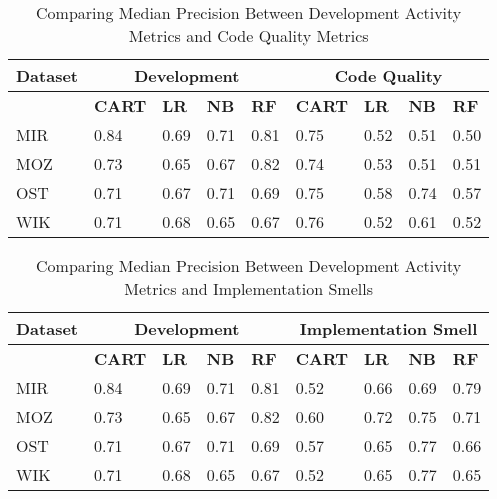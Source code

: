 \documentclass[smallextended]{svjour3}       %
\begin{document}
\begin{table*}[]
\centering
\caption{Comparing Median Precision Between Development Activity Metrics and Code Quality Metrics} 
\label{res:rq1:table:pre:code}
\footnotesize{  
\begin{tabular}{p{1.2cm} p{0.9cm} p{0.9cm} p{0.9cm} p{0.9cm} p{0.9cm} p{0.6cm} p{0.6cm} p{0.6cm}  }
\hline
\textbf{Dataset} & \multicolumn{4}{c}{\textbf{Development}} & \multicolumn{4}{c}{\textbf{Code Quality}}  \\
\hline
 &  \textbf{CART} & \textbf{LR} & \textbf{NB} & \textbf{RF} & \textbf{CART} & \textbf{LR} & \textbf{NB} & \textbf{RF}  \\
\hline
MIR & \cellcolor{lightgray} 0.84 & 0.69 & 0.71 &                        0.81 & 0.75                       & 0.52 & 0.51 & 0.50  \\
MOZ & 0.73                       & 0.65 & 0.67 & \cellcolor{lightgray}  0.82 & 0.74                       & 0.53 & 0.51 & 0.51   \\
OST & 0.71                       & 0.67 & 0.71 & 0.69                        & \cellcolor{lightgray} 0.75 & 0.58 & 0.74 & 0.57   \\
WIK & 0.71                       & 0.68 & 0.65 & 0.67                        & \cellcolor{lightgray} 0.76 & 0.52 & 0.61 & 0.52    \\
\hline
\end{tabular}
}
\end{table*} 

\begin{table*}[]
\centering
\caption{Comparing Median Precision Between Development Activity Metrics and Implementation Smells}
\label{res:rq1:table:pre:smell}
\footnotesize{  
\begin{tabular}{p{1.2cm} p{0.9cm} p{0.9cm} p{0.9cm} p{0.9cm} p{0.9cm} p{0.6cm} p{0.6cm} p{0.6cm}  }
\hline
\textbf{Dataset} & \multicolumn{4}{c}{\textbf{Development}} & \multicolumn{4}{c}{\textbf{Implementation Smell}}  \\
\hline
 &  \textbf{CART} & \textbf{LR} & \textbf{NB} & \textbf{RF} & \textbf{CART} & \textbf{LR} & \textbf{NB} & \textbf{RF}  \\
\hline
MIR & \cellcolor{lightgray} 0.84 & 0.69 & 0.71 &                        0.81 & 0.52 & 0.66 & 0.69 & 0.79   \\
MOZ & 0.73                       & 0.65 & 0.67 & \cellcolor{lightgray}  0.82 & 0.60 & 0.72 & 0.75 & 0.71   \\
OST & 0.71                       & 0.67 & 0.71 & 0.69                        & 0.57 & 0.65 & \cellcolor{lightgray} 0.77 & 0.66   \\
WIK & 0.71                       & 0.68 & 0.65 & 0.67                        & 0.52 & 0.65 & \cellcolor{lightgray} 0.77 & 0.65   \\
\hline
\end{tabular}
}
\end{table*} 
\end{document}
